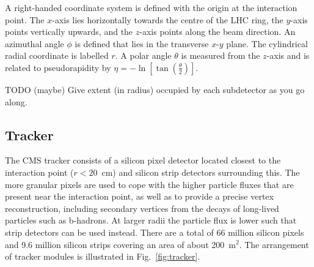 A right-handed coordinate system is defined with the origin at the interaction 
point. The $x$-axis lies horizontally towards the centre of the LHC ring, the 
$y$-axis points vertically upwards, and the $z$-axis points along the beam 
direction. An azimuthal angle $\phi$ is defined that lies in the transverse 
$x$-$y$ plane. The cylindrical radial coordinate is labelled $r$. A polar angle 
$\theta$ is measured from the $z$-axis and is related to 
pseudorapidity by $\eta = -\ln\left[\tan\left(\frac{\theta}{2}\right)\right]$.

TODO (maybe) Give extent (in radius) occupied by each subdetector as you go 
along.

\subsection{Tracker}
The CMS tracker consists of a silicon pixel detector located closest to the 
interaction point ($r<20$~cm) and silicon strip detectors surrounding this. 
The more granular pixels are used to cope with the higher particle fluxes that 
are present near the interaction point, as well as to provide a precise vertex 
reconstruction, including secondary vertices from the decays of long-lived 
particles such as b-hadrons. At larger radii the particle flux is lower such 
that strip detectors can be used instead. There are a total of 66 million 
silicon pixels and 9.6 million silicon strips covering an area of about 
200~m$^2$. The arrangement of tracker modules is illustrated in 
Fig.~\ref{fig:tracker}.

